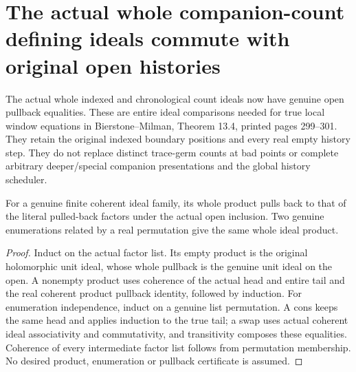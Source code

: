 \section{The actual whole companion-count defining ideals commute with original open histories}

The actual whole indexed and chronological count ideals now have genuine open
pullback equalities. These are entire ideal comparisons needed for true local
window equations in Bierstone--Milman\cite{bierstone-milman97-invent-math},
Theorem 13.4, printed pages 299--301. They retain the original indexed boundary
positions and every real empty history step. They do not replace distinct
trace-germ counts at bad points or complete arbitrary deeper/special companion
presentations and the global history scheduler.

\begin{lemma}
\label{hir:original-coherent-count-real-finite-product-open-pullback}
\leanok
{}
For a genuine finite coherent ideal family, its whole product pulls back to
that of the literal pulled-back factors under the actual open inclusion.
Two genuine enumerations related by a real permutation give the same whole
ideal product.
\end{lemma}
\begin{proof}
Induct on the actual factor list. Its empty product is the original holomorphic
unit ideal, whose whole pullback is the genuine unit ideal on the open.
A nonempty product uses coherence of the actual head and entire tail and the
real coherent product pullback identity, followed by induction. For enumeration
independence, induct on a genuine list permutation. A cons keeps the same head
and applies induction to the true tail; a swap uses actual coherent ideal
associativity and commutativity, and transitivity composes these equalities.
Coherence of every intermediate factor list follows from permutation membership.
No desired product, enumeration or pullback certificate is assumed.
\end{proof}

